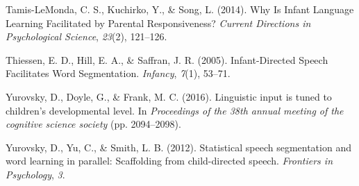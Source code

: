 \documentclass[10pt, letterpaper]{article}
\begin{document}
\leavevmode\hypertarget{ref-tamis-lemonda2014}{}%
Tamis-LeMonda, C. S., Kuchirko, Y., \& Song, L. (2014). Why Is Infant
Language Learning Facilitated by Parental Responsiveness? \emph{Current
Directions in Psychological Science}, \emph{23}(2), 121--126.

\leavevmode\hypertarget{ref-thiessen2005}{}%
Thiessen, E. D., Hill, E. A., \& Saffran, J. R. (2005). Infant-Directed
Speech Facilitates Word Segmentation. \emph{Infancy}, \emph{7}(1),
53--71.

\leavevmode\hypertarget{ref-yurovsky2016}{}%
Yurovsky, D., Doyle, G., \& Frank, M. C. (2016). Linguistic input is
tuned to children's developmental level. In \emph{Proceedings of the
38th annual meeting of the cognitive science society} (pp. 2094--2098).

\leavevmode\hypertarget{ref-yurovsky2012}{}%
Yurovsky, D., Yu, C., \& Smith, L. B. (2012). Statistical speech
segmentation and word learning in parallel: Scaffolding from
child-directed speech. \emph{Frontiers in Psychology}, \emph{3}.


\end{document}
